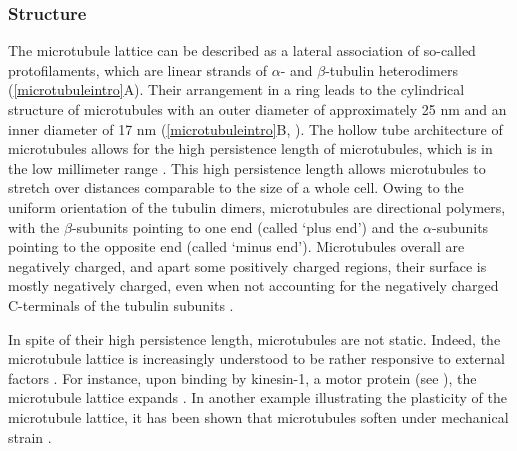\subsubsection{Structure}
The microtubule lattice can be described as a lateral association of so-called protofilaments, which are linear strands of $\alpha$- and $\beta$-tubulin heterodimers (\autoref{microtubuleintro}A). Their arrangement in a ring leads to the cylindrical structure of microtubules with an outer diameter of approximately 25 nm and an inner diameter of 17 nm (\autoref{microtubuleintro}B, ). The hollow tube architecture of microtubules allows for the high persistence length of microtubules, which is in the low millimeter range \parencite{Hawkins2010}. This high persistence length allows microtubules to stretch over distances comparable to the size of a whole cell. Owing to the uniform orientation of the tubulin dimers, microtubules are directional polymers, with the $\beta$-subunits pointing to one end (called ‘plus end’) and the $\alpha$-subunits pointing to the opposite end (called ‘minus end’). Microtubules overall are negatively charged, and apart some positively charged regions, their surface is mostly negatively charged, even when not accounting for the negatively charged C-terminals of the tubulin subunits .\par

In spite of their high persistence length, microtubules are not static. Indeed, the microtubule lattice is increasingly understood to be rather responsive to external factors . For instance, upon binding by kinesin-1, a motor protein (see ), the microtubule lattice expands . In another example illustrating the plasticity of the microtubule lattice, it has been shown that microtubules soften under mechanical strain . \par

